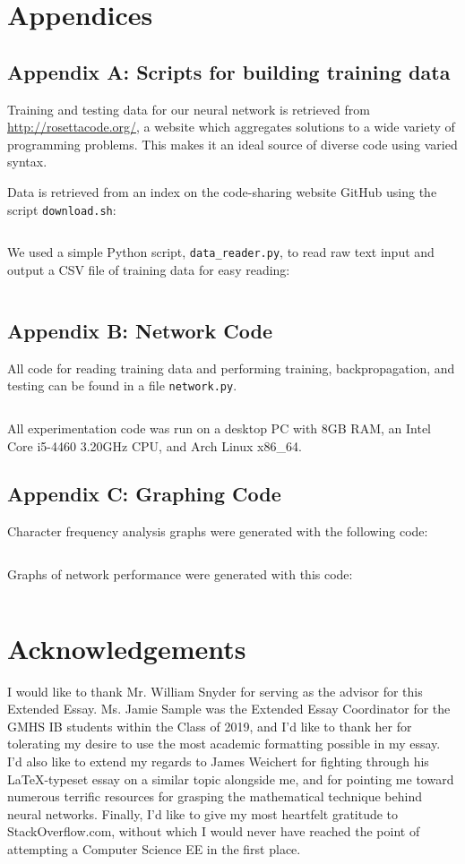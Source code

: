 \documentclass{article}
\begin{document}
\section{Appendices}

\label{sec:appendix_a}
\subsection{Appendix A: Scripts for building training data}
Training and testing data for our neural network is retrieved from \url{http://rosettacode.org/}, a website which aggregates solutions to a wide variety of programming problems. This makes it an ideal source of diverse code using varied syntax.

Data is retrieved from an index on the code-sharing website GitHub\cite{rosettacodegh} using the script \texttt{download.sh}:
\inputminted{bash}{code/data/download.sh}

We used a simple Python script, \texttt{data\_reader.py}, to read raw text input and output a CSV file of training data for easy reading:
\inputminted{cpp}{"code/data_reader.py"}

\label{sec:appendix_b}
\subsection{Appendix B: Network Code}
All code for reading training data and performing training, backpropagation, and testing can be found in a file \texttt{network.py}.
\inputminted{python}{code/network.py}

All experimentation code was run on a desktop PC with 8GB RAM, an Intel Core i5-4460 3.20GHz CPU, and Arch Linux x86\_64.

\label{sec:appendix_c}
\subsection{Appendix C: Graphing Code}
Character frequency analysis graphs were generated with the following code:
\inputminted{python}{"code/data_graphs.py"}
Graphs of network performance were generated with this code:
\inputminted{python}{code/graphs.py}


\section{Acknowledgements}
I would like to thank Mr. William Snyder for serving as the advisor for this Extended Essay. Ms. Jamie Sample was the Extended Essay Coordinator for the GMHS IB students within the Class of 2019, and I'd like to thank her for tolerating my desire to use the most academic formatting possible in my essay. I'd also like to extend my regards to James Weichert for fighting through his \LaTeX-typeset essay on a similar topic alongside me, and for pointing me toward numerous terrific resources for grasping the mathematical technique behind neural networks. Finally, I'd like to give my most heartfelt gratitude to StackOverflow.com, without which I would never have reached the point of attempting a Computer Science EE in the first place.


\end{document}
